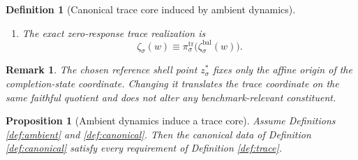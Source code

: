 \documentclass[11pt]{article}
\newcommand{\DataSpace}[1]{\mathcal Y_{#1}^{\mathrm{obs}}}
\newcommand{\AmbientTarget}[1]{E_{#1}^{\mathrm{amb}}}
\newcommand{\BalSym}[1]{\mathbb B_{#1}}
\newcommand{\BalTime}[1]{\vartheta_{#1}^{\mathrm{bal}}}
\newcommand{\BalEmbed}[1]{\zeta_{#1}^{\mathrm{bal}}}
\newcommand{\ReferencePoint}[1]{z_{#1}^{\ast}}
\newcommand{\GapSpace}[1]{H_{#1}}
\newcommand{\CoreState}[1]{\mathcal C_{#1}}
\newcommand{\TraceCoord}[1]{\pi_{#1}^{\mathrm{tr}}}
\newcommand{\TraceTime}[1]{\tau_{#1}^{\mathrm{tr}}}
\newcommand{\TraceEmbed}[1]{\zeta_{#1}}
\newtheorem{definition}{Definition}
\newtheorem{proposition}{Proposition}
\newtheorem{remark}{Remark}
\begin{document}
\begin{definition}[Canonical trace core induced by ambient dynamics]
\begin{enumerate}
\[    (g_{\mathrm{amb}},g_{\mathrm{dat}},g_{\mathrm{sh}})
    \in\BalSym{\sigma}
    \right\},
    \]
    where \(g_{\mathrm{tr}}\) and \(g_{\mathrm{hid}}\) are the restrictions of \(g_{\mathrm{amb}}\) to \(\CoreState{\sigma}\) and \(\GapSpace{\sigma}\), and
    \[
    \TraceTime{\sigma}
    \equiv
    \bigl(
    \BalTime{\sigma}\big|_{\CoreState{\sigma}},
    \BalTime{\sigma}\big|_{\DataSpace{\sigma}},
    \BalTime{\sigma}\big|_{\AmbientTarget{\sigma}},
    \BalTime{\sigma}\big|_{\GapSpace{\sigma}}
    \bigr).
    \]
    \item The exact zero-response trace realization is
    \begin{equation}
    \TraceEmbed{\sigma}(w)
    \equiv
    \TraceCoord{\sigma}\bigl(\BalEmbed{\sigma}(w)\bigr).
    \label{eq:ambienttraceembed}
    \end{equation}
\end{enumerate}
\end{definition}

\begin{remark}
The chosen reference shell point \(\ReferencePoint{\sigma}\) fixes only the affine origin of the completion-state coordinate. Changing it translates the trace coordinate on the same faithful quotient and does not alter any benchmark-relevant constituent.
\end{remark}

\begin{proposition}[Ambient dynamics induce a trace core]
\label{prop:induce}
Assume Definitions \ref{def:ambient} and \ref{def:canonical}. Then the canonical data of Definition \ref{def:canonical} satisfy every requirement of Definition \ref{def:trace}.
\end{proposition}
\end{document}

